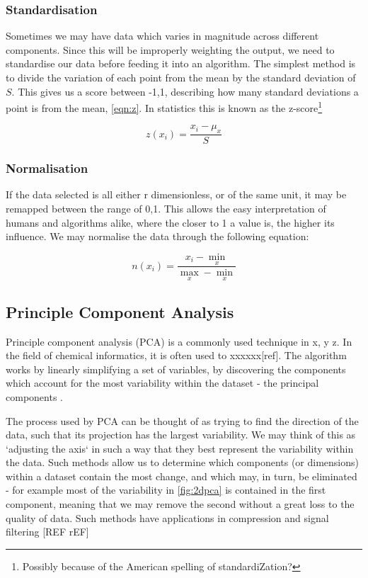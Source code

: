 \subsubsection{Standardisation}
Sometimes we may have data which varies in magnitude across different components. Since this will be improperly weighting the output, we need to standardise our data before feeding it into an algorithm. The simplest method is to divide the variation of each point from the mean by the standard deviation of $S$. This gives us a score between {-1,1}, describing how many standard deviations a point is from the mean, \autoref{eqn:z}. In statistics this is  known as the z-score\footnote{Possibly because of the American spelling of standardiZation?}

\begin{equation}
    z(x_i) = \frac{x_i - \mu_x}{S}
    \label{eqn:z}
\end{equation}

\subsubsection{Normalisation}
If the data selected is all either
r dimensionless, or of the same unit, it may be remapped between the range of {0,1}. This allows the easy interpretation of humans and algorithms alike, where the closer to 1 a value is, the higher its influence. We may normalise the data through the following equation:

\begin{equation}
    n(x_i) = \frac{x_i - \min_x }{\max_x - \min_x}
    \label{eqn:n}
\end{equation}



\subsection{Principle Component Analysis}
Principle component analysis (PCA) is a commonly used technique in x, y z. In the field of chemical informatics, it is often used to xxxxxx[ref]. The algorithm works by linearly simplifying a set of variables, by discovering the components which account for the most variability within the dataset - the principal components \cite{pca,pca2}.

The process used by PCA can be thought of as trying to find the direction of the data, such that its projection has the largest variability. We may think of this as `adjusting the axis` in such a way that they best represent the variability within the data. Such methods allow us to determine which components (or dimensions) within a dataset contain the most change, and which may, in turn, be eliminated - for example most of the variability in \autoref{fig:2dpca} is contained in the first component, meaning that we may remove the second without a great loss to the quality of data. Such methods have applications in compression and signal filtering [REF rEF]


